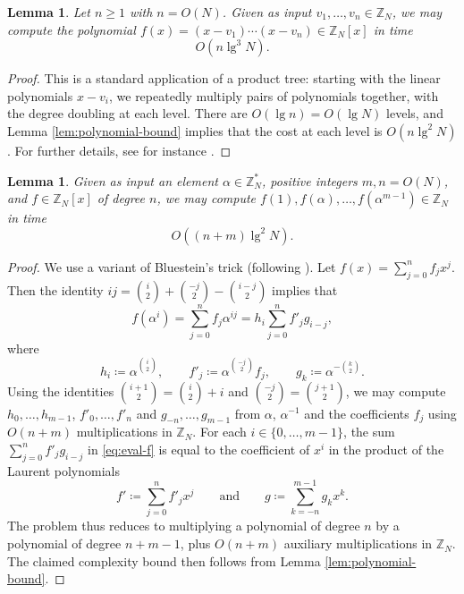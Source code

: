 \documentclass[reqno]{amsart}
\newtheorem{lem}[thm]{Lemma}
\theoremstyle{remark}
\numberwithin{equation}{section}
\numberwithin{thm}{section}
\newcommand{\ZZ}{\mathbb{Z}}
\renewcommand{\geq}{\geqslant}
\newcommand{\defeq}{\coloneqq}
\begin{document}
\begin{lem}
\label{lem:product-tree}
  Let $n \geq 1$ with $n = O(N)$.
  Given as input $v_1, \ldots, v_n \in \ZZ_N$,
  we may compute the polynomial
  $f(x) = (x - v_1) \cdots (x - v_n) \in \ZZ_N[x]$
  in time
    \[ O(n \lg^3 N). \]
\end{lem}
\begin{proof}
  This is a standard application of a product tree:
  starting with the linear polynomials $x - v_i$,
  we repeatedly multiply pairs of polynomials together,
  with the degree doubling at each level.
  There are $O(\lg n) = O(\lg N)$ levels,
  and Lemma \ref{lem:polynomial-bound} implies that
  the cost at each level is $O(n \lg^2 N)$.
  For further details, see for instance \cite[Algorithm 10.3]{vzGG-compalg3}.
\end{proof}

\begin{lem}
\label{lem:bluestein}
  Given as input an element $\alpha \in \ZZ^*_N$,
  positive integers $m, n = O(N)$,
  and $f \in \ZZ_N[x]$ of degree $n$,
  we may compute $f(1), f(\alpha), \ldots, f(\alpha^{m-1}) \in \ZZ_N$
  in time
    \[ O((n + m) \lg^2 N). \]
\end{lem}
\begin{proof}
  We use a variant of Bluestein's trick \cite{Blu-dft}
  (following \cite[Lem.~3]{HvdH-zmatmult}).
  Let $f(x) = \sum_{j=0}^n f_j x^j$.
  Then the identity $ij = \binom{i}{2} + \binom{-j}{2} - \binom{i-j}{2}$
  implies that
  \begin{equation}
  \label{eq:eval-f}
    f(\alpha^i) = \sum_{j=0}^n f_j \alpha^{ij} = h_i \sum_{j=0}^n f'_j g_{i-j},
  \end{equation}
  where
    \[ h_i  \defeq \alpha^{\binom{i}{2}}, \qquad
       f'_j \defeq \alpha^{\binom{-j}{2}} f_j, \qquad
       g_k  \defeq \alpha^{-\binom{k}{2}}. \]
  Using the identities $\binom{i+1}{2} = \binom{i}{2} + i$ and
  $\binom{-j}{2} = \binom{j+1}{2}$,
  we may compute $h_0, \ldots, h_{m-1}$, $f'_0, \ldots, f'_n$ and
  $g_{-n}, \ldots, g_{m-1}$ from $\alpha$, $\alpha^{-1}$
  and the coefficients $f_j$ using $O(n + m)$ multiplications in $\ZZ_N$.
  For each $i \in \{0, \ldots, m-1\}$,
  the sum $\sum_{j=0}^n f'_j g_{i-j}$ in \eqref{eq:eval-f}
  is equal to the coefficient of $x^i$ in
  the product of the Laurent polynomials
    \[ f' \defeq \sum_{j=0}^n f'_j x^j \qquad \text{and} \qquad
       g  \defeq \sum_{k=-n}^{m-1} g_k x^k.  \]
  The problem thus reduces to multiplying a polynomial of degree $n$
  by a polynomial of degree $n + m - 1$,
  plus $O(n + m)$ auxiliary multiplications in $\ZZ_N$.
  The claimed complexity bound then follows from
  Lemma \ref{lem:polynomial-bound}.
\end{proof}
\end{document}
